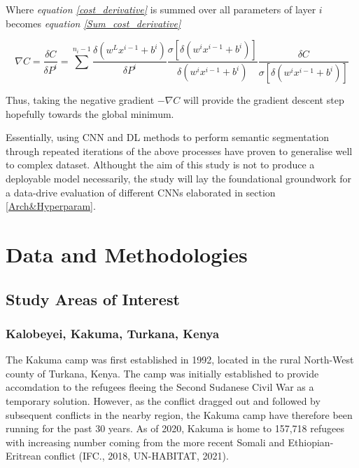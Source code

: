 \documentclass[11pt, a4paper, twoside]{report}
\begin{document}
Where \textit{equation \ref{cost_derivative}} is summed over all parameters of layer $i$ becomes \textit{equation \ref{Sum_cost_derivative}}\\\par

\begin{equation}
  \label{Sum_cost_derivative}
  \nabla C = \frac{\delta C}{\delta P^{i}} = \sum^{n_{i}-1} \frac{\delta(w^{L}x^{i-1} + b^{i})}{\delta P^{i}} \frac{\sigma[\delta(w^{i}x^{i-1} + b^{i})]}{\delta (w^{i}x^{i-1} + b^{i})} \frac{\delta C}{\sigma[\delta(w^{i}x^{i-1} + b^{i})]}
\end{equation}

Thus, taking the negative gradient $-\nabla C$ will provide the gradient descent step hopefully towards the global minimum.\\\par

Essentially, using CNN and DL methods to perform semantic segmentation through repeated iterations of the above processes have proven to generalise well to complex dataset. Althought the aim of this study is not to produce a deployable model necessarily, the study will lay the foundational groundwork for a data-drive evaluation of different CNNs elaborated in section \ref{Arch&Hyperparam}.\\\par

\newpage

\chapter{Data and Methodologies}\label{DataandMethods}

\section{Study Areas of Interest}\label{AOI}

\subsection{Kalobeyei, Kakuma, Turkana, Kenya}\label{Kalobeyei}

The Kakuma camp was first established in 1992, located in the rural North-West county of Turkana, Kenya. The camp was initially established to provide accomdation to the refugees fleeing the Second Sudanese Civil War as a temporary solution. However, as the conflict dragged out and followed by subsequent conflicts in the nearby region, the Kakuma camp have therefore been running for the past 30 years. As of 2020, Kakuma is home to 157,718 refugees with increasing number coming from the more recent Somali and Ethiopian-Eritrean conflict (IFC., 2018, UN-HABITAT, 2021).\\\par
\end{document}
